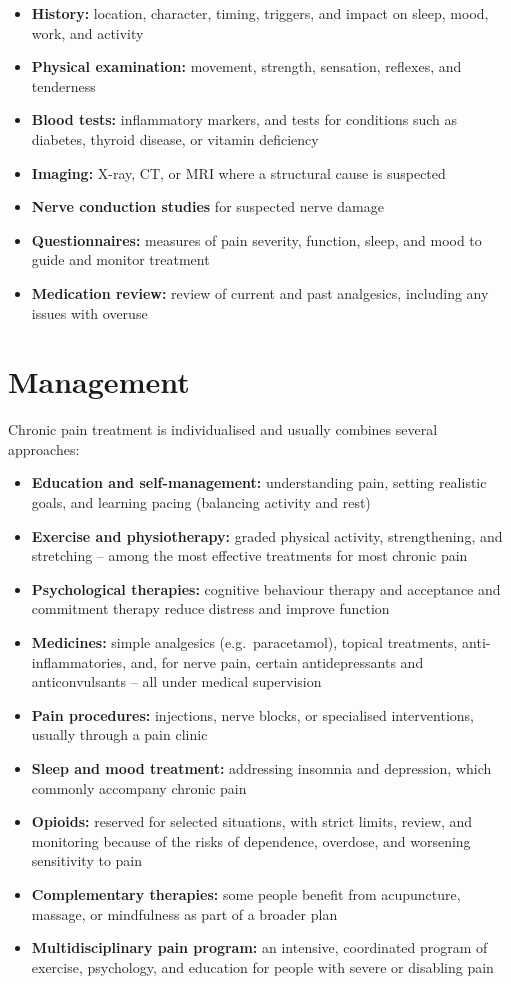 \begin{itemize}
    \item \textbf{History:} location, character, timing, triggers, and impact on sleep, mood, work, and activity
    \item \textbf{Physical examination:} movement, strength, sensation, reflexes, and tenderness
    \item \textbf{Blood tests:} inflammatory markers, and tests for conditions such as diabetes, thyroid disease, or vitamin deficiency
    \item \textbf{Imaging:} X-ray, CT, or MRI where a structural cause is suspected
    \item \textbf{Nerve conduction studies} for suspected nerve damage
    \item \textbf{Questionnaires:} measures of pain severity, function, sleep, and mood to guide and monitor treatment
    \item \textbf{Medication review:} review of current and past analgesics, including any issues with overuse
\end{itemize}

\section*{Management}
Chronic pain treatment is individualised and usually combines several approaches:

\begin{itemize}
    \item \textbf{Education and self-management:} understanding pain, setting realistic goals, and learning pacing (balancing activity and rest)
    \item \textbf{Exercise and physiotherapy:} graded physical activity, strengthening, and stretching -- among the most effective treatments for most chronic pain
    \item \textbf{Psychological therapies:} cognitive behaviour therapy and acceptance and commitment therapy reduce distress and improve function
    \item \textbf{Medicines:} simple analgesics (e.g.\ paracetamol), topical treatments, anti-inflammatories, and, for nerve pain, certain antidepressants and anticonvulsants -- all under medical supervision
    \item \textbf{Pain procedures:} injections, nerve blocks, or specialised interventions, usually through a pain clinic
    \item \textbf{Sleep and mood treatment:} addressing insomnia and depression, which commonly accompany chronic pain
    \item \textbf{Opioids:} reserved for selected situations, with strict limits, review, and monitoring because of the risks of dependence, overdose, and worsening sensitivity to pain
    \item \textbf{Complementary therapies:} some people benefit from acupuncture, massage, or mindfulness as part of a broader plan
    \item \textbf{Multidisciplinary pain program:} an intensive, coordinated program of exercise, psychology, and education for people with severe or disabling pain
\end{itemize}


